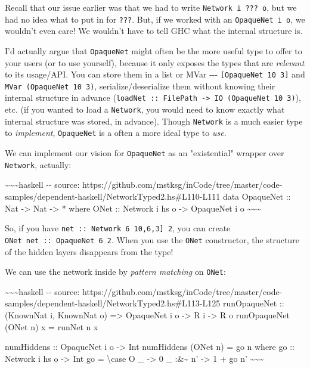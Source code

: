 \documentclass[]{article}
\begin{document}
Recall that our issue earlier was that we had to write
\texttt{Network\ i\ ???\ o}, but we had no idea what to put in for \texttt{???}.
But, if we worked with an \texttt{OpaqueNet\ i\ o}, we wouldn't even care! We
wouldn't have to tell GHC what the internal structure is.

I'd actually argue that \texttt{OpaqueNet} might often be the more useful type
to offer to your users (or to use yourself), because it only exposes the types
that are \emph{relevant} to its usage/API. You can store them in a list or MVar
-\/-\/- \texttt{{[}OpaqueNet\ 10\ 3{]}} and \texttt{MVar\ (OpaqueNet\ 10\ 3)},
serialize/deserialize them without knowing their internal structure in advance
(\texttt{loadNet\ ::\ FilePath\ -\textgreater{}\ IO\ (OpaqueNet\ 10\ 3)}), etc.
(if you wanted to load a \texttt{Network}, you would need to know exactly what
internal structure was stored, in advance). Though \texttt{Network} is a much
easier type to \emph{implement}, \texttt{OpaqueNet} is a often a more ideal type
to \emph{use}.

We can implement our vision for \texttt{OpaqueNet} as an "existential" wrapper
over \texttt{Network}, actually:

\textasciitilde{}\textasciitilde{}\textasciitilde{}haskell -\/- source:
https://github.com/mstksg/inCode/tree/master/code-samples/dependent-haskell/NetworkTyped2.hs\#L110-L111
data OpaqueNet :: Nat -\textgreater{} Nat -\textgreater{} * where ONet ::
Network i hs o -\textgreater{} OpaqueNet i o
\textasciitilde{}\textasciitilde{}\textasciitilde{}

So, if you have \texttt{net\ ::\ Network\ 6\ \textquotesingle{}{[}10,6,3{]}\ 2},
you can create \texttt{ONet\ net\ ::\ OpaqueNet\ 6\ 2}. When you use the
\texttt{ONet} constructor, the structure of the hidden layers disappears from
the type!

We can use the network inside by \emph{pattern matching} on \texttt{ONet}:

\textasciitilde{}\textasciitilde{}\textasciitilde{}haskell -\/- source:
https://github.com/mstksg/inCode/tree/master/code-samples/dependent-haskell/NetworkTyped2.hs\#L113-L125
runOpaqueNet :: (KnownNat i, KnownNat o) =\textgreater{} OpaqueNet i o
-\textgreater{} R i -\textgreater{} R o runOpaqueNet (ONet n) x = runNet n x

numHiddens :: OpaqueNet i o -\textgreater{} Int numHiddens (ONet n) = go n where
go :: Network i hs o -\textgreater{} Int go = \textbackslash{}case O \_
-\textgreater{} 0 \_ :\&\textasciitilde{} n' -\textgreater{} 1 + go n'
\textasciitilde{}\textasciitilde{}\textasciitilde{}
\end{document}
